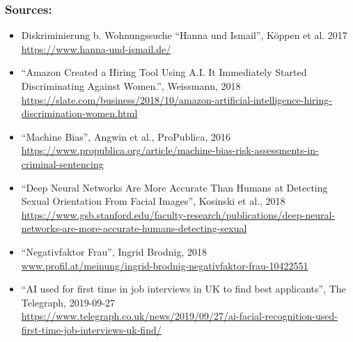 \documentclass[aspectratio=169,x11names]{beamer}
\begin{document}

\begin{frame}
\frametitle{Sources:}
\scriptsize
\begin{itemize}
\item Diskriminierung b. Wohnungssuche ``Hanna und Ismail'', Köppen et al.  2017\\
\url{https://www.hanna-und-ismail.de/}

\item ``Amazon Created a Hiring Tool Using A.I. It Immediately Started Discriminating Against Women.'', Weissmann, 2018\\ \url{https://slate.com/business/2018/10/amazon-artificial-intelligence-hiring-discrimination-women.html}

\item ``Machine Bias'', Angwin et al., ProPublica, 2016\\ \url{https://www.propublica.org/article/machine-bias-risk-assessments-in-criminal-sentencing}

\item ``Deep Neural Networks Are More Accurate Than Humans at Detecting Sexual Orientation From Facial Images'', Kosinski et al., 2018\\ \url{https://www.gsb.stanford.edu/faculty-research/publications/deep-neural-networks-are-more-accurate-humans-detecting-sexual}

\item ``Negativfaktor Frau'', Ingrid Brodnig, 2018 \\ \url{www.profil.at/meinung/ingrid-brodnig-negativfaktor-frau-10422551}

\item ``AI used for first time in job interviews in UK to find best applicants'', The Telegraph, 2019-09-27 \\ \url{https://www.telegraph.co.uk/news/2019/09/27/ai-facial-recognition-used-first-time-job-interviews-uk-find/}

\end{itemize}
\end{frame}
\end{document}
